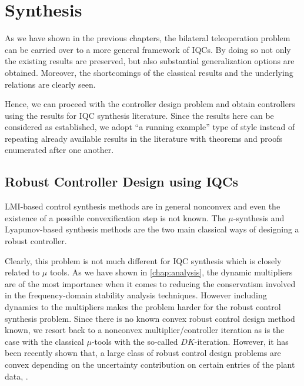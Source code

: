\chapter{Synthesis}
\label{chap:synth}

As we have shown in the previous chapters, the bilateral teleoperation problem can be carried over to a more general
framework of IQCs. By doing so not only the existing results are preserved, but also substantial generalization
options are obtained. Moreover, the shortcomings of the classical results and the underlying relations are clearly 
seen. 

Hence, we can proceed with the controller design problem and obtain controllers using the results for IQC synthesis
literature. Since the results here can be considered as established, we adopt \enquote{a running example} type of style 
instead of repeating already available results in the literature with theorems and proofs enumerated after one another.

\section{Robust Controller Design using IQCs}
LMI-based control synthesis methods are in general nonconvex and even the existence of a possible convexification step 
is not known. The $\mu$-synthesis and Lyapunov-based synthesis methods are the two main classical ways of designing
a robust controller. 

Clearly, this problem is not much different for IQC synthesis which is closely related to $\mu$
tools. As we have shown in \cref{chap:analysis}, the dynamic multipliers are of the most importance when it comes to 
reducing the conservatism involved in the frequency-domain stability analysis techniques. However including dynamics 
to the multipliers makes the problem harder for the robust control synthesis problem. Since there is no known convex 
robust control design method known, we resort back to a nonconvex multiplier/controller iteration as is the case with 
the classical $\mu$-tools with the so-called $DK$-iteration. However, it has been recently shown that, a large class
of robust control design problems are convex depending on the uncertainty contribution on certain entries of the plant 
data, \cite{scherer2009}. 
